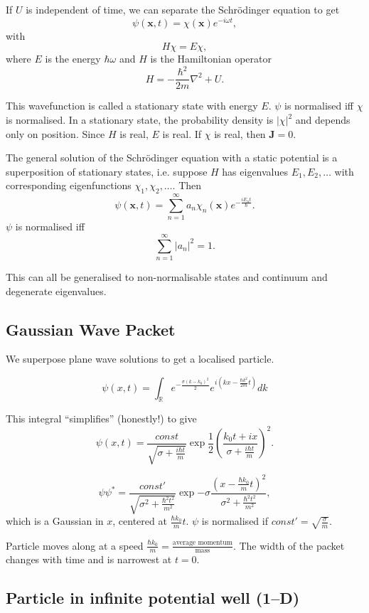 \documentclass[a4paper]{article}
\newcommand{\R}{\mathbb{R}}
\newcommand{\schrod}{Schr{\"o}dinger }
\newcommand{\abs}[1]{\left| #1 \right|}
\begin{document}
If $U$ is independent of time, we can separate the \schrod equation to get
\[
\psi(\mathbf{x},t) = \chi(\mathbf{x})e^{-i\omega t},
\] with
\[
H\chi = E\chi,
\] where $E$ is the energy $\hbar \omega$ and $H$ is the Hamiltonian operator
\[
H = -\frac{\hbar^2}{2 m}\nabla^2 + U.
\]

This wavefunction is called a stationary state with energy $E$. $\psi$ is
normalised iff $\chi$ is normalised.  In a stationary state, the probability
density is $\abs{\chi}^2$ and depends only on position.  Since $H$ is real,
$E$ is real.  If $\chi$ is real, then $\mathbf{J}=0$.

The general solution of the \schrod equation with a static potential is a
superposition of stationary states, i.e. suppose $H$ has eigenvalues
$E_1, E_2, \dots$ with corresponding eigenfunctions $\chi_1, \chi_2, \dots$.
Then
\[
\psi(\mathbf{x},t) = \sum_{n=1}^{\infty} a_n\chi_n(\mathbf{x}) e^{-\frac{i E_n t}{\hbar}}.
\]  $\psi$ is normalised iff
\[
\sum_{n=1}^{\infty} \abs{a_n}^2 = 1.
\]

This can all be generalised to non-normalisable states and continuum 
and degenerate eigenvalues.

\subsection{Gaussian Wave Packet}

We superpose plane wave solutions to get a localised particle.

\[
\psi(x,t) = \int_{\R} e^{-\frac{\sigma (k-k_0)^2}{2}} e^{i(k x - 
\frac{\hbar k^2}{2m}t)} dk
\]

This integral ``simplifies'' (honestly!) to give
\[
\psi(x,t) = \frac{const}{\sqrt{\sigma + \frac{i \hbar t}{m}}}
\exp \frac{1}{2}\left( \frac{k_0 t + i x}{\sigma + \frac{i \hbar t}{m}}
\right)^2.
\]

\[
\psi \psi^* = \frac{const'}{\sqrt{\sigma^2 + \frac{\hbar^2 t^2}{m^2}}}
\exp{-\sigma
\frac{\left( x - \frac{\hbar k_0}{m}t
\right)^2}
{\sigma^2 + \frac{\hbar^2 t^2}{m^2}}}, 
\] which is a Gaussian in $x$, centered at $\frac{\hbar k_0}{m}t$.  $\psi$ is
normalised if $const' = \sqrt{\frac{\sigma}{m}}$.

Particle moves along at a speed $\frac{\hbar k_0}{m}=\frac{\text{average momentum}}{\text{mass}}$.  The width of the packet changes with time and is narrowest
at $t=0$.

\subsection{Particle in infinite potential well (1--D)}
\end{document}
